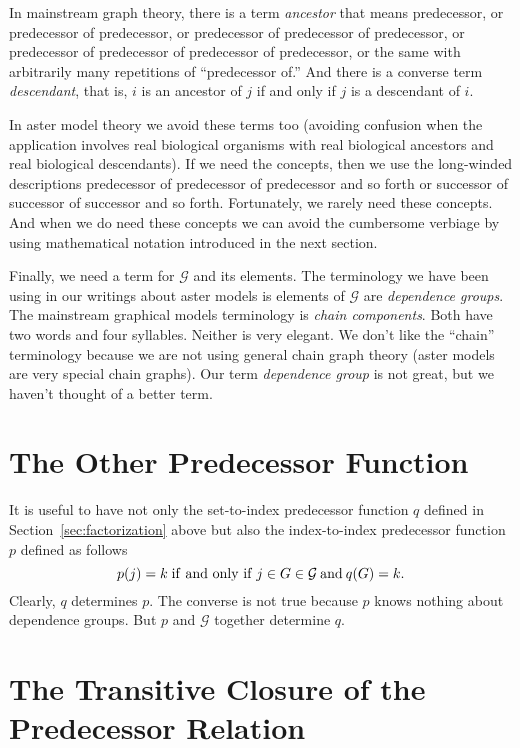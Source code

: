 In mainstream graph theory, there is a term \emph{ancestor} that means
predecessor, or predecessor of predecessor,
or predecessor of predecessor of predecessor,
or predecessor of predecessor of predecessor of predecessor,
or the same with arbitrarily many repetitions of ``predecessor of.''
And there is a converse term \emph{descendant}, that is, $i$ is an ancestor
of $j$ if and only if $j$ is a descendant of $i$.

In aster model theory we avoid these terms too (avoiding confusion when
the application involves real biological organisms with real biological
ancestors and real biological descendants).  If we need the concepts,
then we use the long-winded descriptions
predecessor of predecessor of predecessor and so forth or
successor of successor of successor and so forth.
Fortunately, we rarely need these concepts.
And when we do need these concepts we can avoid the cumbersome verbiage
by using mathematical notation introduced in the next section.

Finally, we need a term for $\mathcal{G}$ and its elements.
The terminology we have been using in our writings about aster models is
elements of $\mathcal{G}$ are \emph{dependence groups}.
The mainstream graphical models terminology \citep{lauritzen} is
\emph{chain components}.  Both have two words and four syllables.
Neither is very elegant.  We don't like the ``chain'' terminology because
we are not using general chain graph theory (aster models are very special
chain graphs).  Our term \emph{dependence group} is not great, but we haven't
thought of a better term.

\section{The Other Predecessor Function}

It is useful to have not only the set-to-index predecessor function $q$
defined in Section~\ref{sec:factorization} above but also the index-to-index
predecessor function $p$ defined as follows
$$
   p(j) = k \mathrel{\rm if\ and\ only\ if} j \in G \in \mathcal{G} \mathbin{\rm and} q(G) = k.
$$
Clearly, $q$ determines $p$.
The converse is not true because $p$ knows nothing about dependence groups.
But $p$ and $\mathcal{G}$ together determine $q$.

\section{The Transitive Closure of the Predecessor Relation}
\label{sec:closure}

